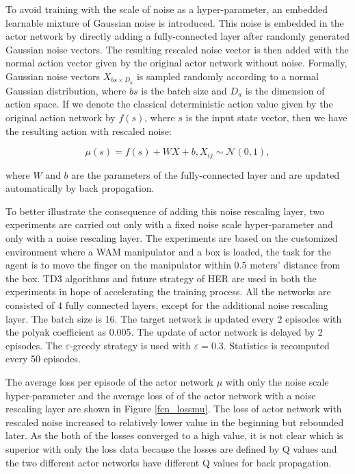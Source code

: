 \documentclass[a4paper, 12pt]{report}
\begin{document}
    To avoid training with the scale of noise as a hyper-parameter, an embedded learnable mixture of Gaussian noise is introduced. This noise is embedded in the actor network by directly adding a fully-connected layer after randomly generated Gaussian noise vectors. The resulting rescaled noise vector is then added with the normal action vector given by the original actor network without noise. Formally, Gaussian noise vectors $X_{bs\times D_a}$ is sampled randomly according to a normal Gaussian distribution, where $bs$ is the batch size and $D_a$ is the dimension of action space. If we denote the classical deterministic action value given by the original action network by $f(s)$, where $s$ is the input state vector, then we have the resulting action with rescaled noise:

    $$ \mu(s) = f(s) + W X + b, X_{ij}\sim\mathcal N(0,1),$$

    where $W$ and $b$ are the parameters of the fully-connected layer and are updated automatically by back propagation.

    To better illustrate the consequence of adding this noise rescaling layer, two experiments are carried out only with a fixed noise scale hyper-parameter and only with a noise rescaling layer. The experiments are based on the customized environment where a WAM manipulator and a box is loaded, the task for the agent is to move the finger on the manipulator within 0.5 meters' distance from the box. TD3 algorithms and future strategy of HER are used in both the experiments in hope of accelerating the training process. All the networks are consisted of 4 fully connected layers, except for the additional noise rescaling layer. The batch size is 16. The target network is updated every 2 episodes with the polyak coefficient as 0.005. The update of actor network is delayed by 2 episodes. The $\varepsilon$-greedy strategy is used with $\varepsilon=0.3$. Statistics is recomputed every 50 episodes.
    

    The average loss per episode of the actor network $\mu$ with only the noise scale hyper-parameter and the average loss of of the actor network with a noise rescaling layer are shown in Figure \ref{fcn_lossmu}. The loss of actor network with rescaled noise increased to relatively lower value in the beginning but rebounded later. As the both of the losses converged to a high value, it is not clear which is superior with only the loss data because the losses are defined by Q values and the two different actor networks have different Q values for back propagation.
\end{document}
